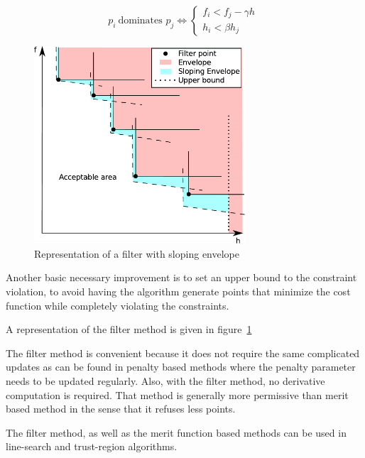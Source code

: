 \begin{definition}
  \begin{equation}
    p_i\ \text{dominates }p_j \Leftrightarrow \left\{
        \begin{array}{l}
    f_i < f_j - \gamma h\ \\
    h_i < \beta h_j
  \end{array}  \right.
  \end{equation}
\end{definition}

\begin{figure}
  \centering
  \includegraphics[width=0.7\textwidth]{filter.pdf}
  \caption{Representation of a filter with sloping envelope}
\label{fig:Filter}
\end{figure}

Another basic necessary improvement is to set an upper bound to the constraint violation, to avoid having the algorithm generate points that minimize the cost function while completely violating the constraints.

A representation of the filter method is given in figure~\ref{fig:Filter}

The filter method is convenient because it does not require the same complicated updates as can be found in penalty based methods where the penalty parameter needs to be updated regularly.
Also, with the filter method, no derivative computation is required.
That method is generally more permissive than merit based method in the sense that it refuses less points.

The filter method, as well as the merit function based methods can be used in line-search and trust-region algorithms.

